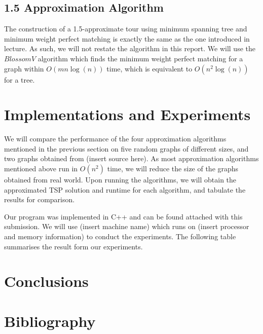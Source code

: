 \documentclass[paper=a4, fontsize=11pt]{scrartcl}	%
\numberwithin{equation}{section}		%
\numberwithin{figure}{section}			%
\numberwithin{table}{section}				%
\begin{document}
\subsection{1.5 Approximation Algorithm}
The construction of a 1.5-approximate tour using minimum spanning tree and minimum weight perfect matching is exactly the same as the one introduced in lecture. As such, we will not restate the algorithm in this report. We will use the $Blossom V$ algorithm \cite{kolmogorov} which finds the minimum weight perfect matching for a graph within $O(mn \log(n))$ time, which is equivalent to $O(n^2 \log(n))$ for a tree.

\section{Implementations and Experiments}

We will compare the performance of the four approximation algorithms mentioned in the previous section on five random graphs of different sizes, and two graphs obtained from (insert source here). As most approximation algorithms mentioned above run in $O(n^2)$ time, we will reduce the size of the graphs obtained from real world. Upon running the algorithms, we will obtain the approximated TSP solution and runtime for each algorithm, and tabulate the results for comparison.

Our program was implemented in C++ and can be found attached with this submission. We will use (insert machine name) which runs on (insert processor and memory information) to conduct the experiments. The following table summarises the result form our experiments.




\section{Conclusions}

\section{Bibliography}

\nocite{*}

\end{document}
